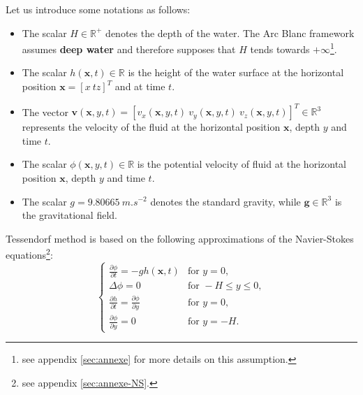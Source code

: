 \documentclass[final]{jcgt}
\def\Framework{The Arc Blanc framework\xspace}
\begin{document}
Let us introduce some notations as follows:
\begin{itemize}
	\item The scalar $H\in\mathbb R^+$ denotes the depth of the water. \Framework assumes \textbf{deep water} and therefore supposes that $H$ tends towards $+\infty$\footnote{see appendix \ref{sec:annexe} for more details on this assumption.}.
	\item The scalar $h(\mathbf x, t)\in\mathbb R$ is the height of the water surface at the horizontal position $\mathbf x=\left[x ~tz\right]^T$ and at time $t$.
	\item The vector $\mathbf{v}(\mathbf x, y, t) =  \left[v_x(\mathbf x, y, t)\ v_y(\mathbf x, y, t)\ v_z(\mathbf x, y, t)\right]^T\in\mathbb R^3$ represents the velocity of the fluid at the horizontal position $\mathbf x$, depth $y$ and time $t$.
	\item The scalar $\phi(\mathbf x,y,t)\in\mathbb R$ is the potential velocity of fluid at the horizontal position $\mathbf x$, depth $y$ and time $t$.
	\item The scalar $g=9.80665~m.s^{-2}$ denotes the standard gravity, while $\mathbf g\in\mathbb R^3$ is the gravitational field.
\end{itemize}

Tessendorf method is based on the following approximations of the Navier-Stokes equations\footnote{see appendix \ref{sec:annexe-NS}.}:
\begin{equation}
	\label{equa:systemTessendorf}
	\left\lbrace
	\begin{array}{ll}
		\frac{\partial\phi}{\partial t} = -gh(\mathbf x,t)            & \text{for }y=0,            \\
		\Delta\phi=0                                                  & \text{for }-H\leq y\leq 0, \\
		\frac{\partial h}{\partial t}=\frac{\partial\phi}{\partial y} & \text{for }y=0,            \\
		\frac{\partial\phi}{\partial y}=0                             & \text{for }y=-H.
	\end{array}
	\right.
\end{equation}

\end{document}
